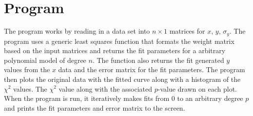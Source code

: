 \documentclass[10pt,a4paper]{article}
\begin{document}
\section{Program}
The program works by reading in a data set into $n \times 1$ matrices for $x$, $y$, $\sigma_y$.  The program uses a generic least squares function that formats the weight matrix based on the input matrices and returns the fit parameters for a arbitrary polynomial model of degree $n$. The function also returns the fit generated $y$ values from the $x$ data and the error matrix for the fit parameters.  The program then plots the original data with the fitted curve along with a histogram of the $\chi^{2}$ values.  The $\chi^{2}$ value along with the associated $p$-value drawn on each plot. When the program is run, it iteratively makes fits from 0 to an arbitrary degree $p$ and prints the fit parameters and error matrix to the screen.
\end{document}
